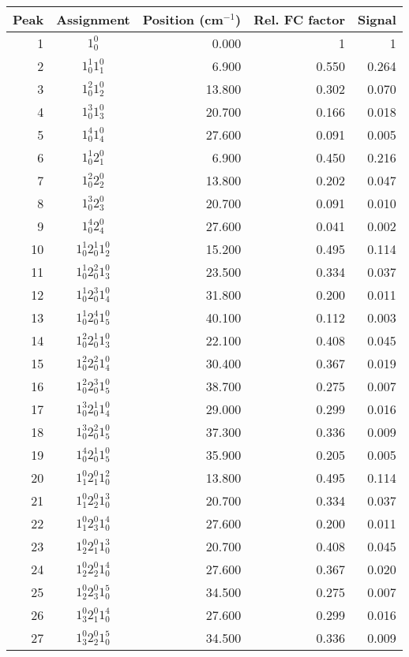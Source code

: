 

\renewcommand{\baselinestretch}{1.5}
\begin{table}
\begin{tabular}{rcrrr}
Peak& Assignment&Position (cm$^{-1}$)& Rel. FC factor& Signal\\
\hline
1& $1^0_0$&0.000&1&1\\
2&$1_0^1 1_1^0$& 6.900& 0.550& 0.264\\
3&$1_0^2 1_2^0$& 13.800& 0.302& 0.070\\
4&$1_0^3 1_3^0$& 20.700& 0.166& 0.018\\
5&$1_0^4 1_4^0$& 27.600& 0.091& 0.005\\
6&$1_0^1 2_1^0$& 6.900& 0.450& 0.216\\
7&$1_0^2 2_2^0$& 13.800& 0.202& 0.047\\
8&$1_0^3 2_3^0$& 20.700& 0.091& 0.010\\
9&$1_0^4 2_4^0$& 27.600& 0.041& 0.002\\
10&$1_0^1 2_0^1 1_2^0$& 15.200& 0.495& 0.114\\
11&$1_0^1 2_0^2 1_3^0$& 23.500& 0.334& 0.037\\
12&$1_0^1 2_0^3 1_4^0$& 31.800& 0.200& 0.011\\
13&$1_0^1 2_0^4 1_5^0$& 40.100& 0.112& 0.003\\
14&$1_0^2 2_0^1 1_3^0$& 22.100& 0.408& 0.045\\
15&$1_0^2 2_0^2 1_4^0$& 30.400& 0.367& 0.019\\
16&$1_0^2 2_0^3 1_5^0$& 38.700& 0.275& 0.007\\
17&$1_0^3 2_0^1 1_4^0$& 29.000& 0.299& 0.016\\
18&$1_0^3 2_0^2 1_5^0$& 37.300& 0.336& 0.009\\
19&$1_0^4 2_0^1 1_5^0$& 35.900& 0.205& 0.005\\
20&$1_1^0 2_1^0 1_0^2$& 13.800& 0.495& 0.114\\
21&$1_1^0 2_2^0 1_0^3$& 20.700& 0.334& 0.037\\
22&$1_1^0 2_3^0 1_0^4$& 27.600& 0.200& 0.011\\
23&$1_2^0 2_1^0 1_0^3$& 20.700& 0.408& 0.045\\
24&$1_2^0 2_2^0 1_0^4$& 27.600& 0.367& 0.020\\
25&$1_2^0 2_3^0 1_0^5$& 34.500& 0.275& 0.007\\
26&$1_3^0 2_1^0 1_0^4$& 27.600& 0.299& 0.016\\
27&$1_3^0 2_2^0 1_0^5$& 34.500& 0.336& 0.009\\

\end{tabular}
\end{table}
